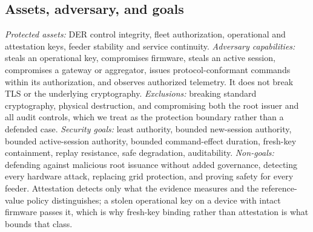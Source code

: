 \subsection{Assets, adversary, and goals}
\emph{Protected assets:} DER control integrity, fleet authorization, operational and attestation
keys, feeder stability and service continuity. \emph{Adversary capabilities:} steals an
operational key, compromises firmware, steals an active session, compromises a gateway or
aggregator, issues protocol-conformant commands within its authorization, and observes authorized
telemetry. It does not break TLS or the underlying cryptography. \emph{Exclusions:} breaking
standard cryptography, physical destruction, and compromising both the root issuer and all audit
controls, which we treat as the protection boundary rather than a defended case.
\emph{Security goals:} least authority, bounded new-session authority, bounded active-session
authority, bounded command-effect duration, fresh-key containment, replay resistance, safe
degradation, auditability. \emph{Non-goals:} defending against malicious root issuance without
added governance, detecting every hardware attack, replacing grid protection, and proving safety
for every feeder. Attestation detects only what the evidence measures and the reference-value
policy distinguishes; a stolen operational key on a device with intact firmware passes it, which
is why fresh-key binding rather than attestation is what bounds that class.
